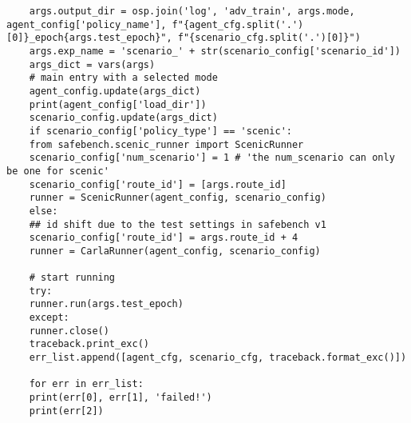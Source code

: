 \begin{enumerate}
\begin{verbatim}
	args.output_dir = osp.join('log', 'adv_train', args.mode, agent_config['policy_name'], f"{agent_cfg.split('.')[0]}_epoch{args.test_epoch}", f"{scenario_cfg.split('.')[0]}")
	args.exp_name = 'scenario_' + str(scenario_config['scenario_id'])
	args_dict = vars(args)
	# main entry with a selected mode
	agent_config.update(args_dict)
	print(agent_config['load_dir'])
	scenario_config.update(args_dict)
	if scenario_config['policy_type'] == 'scenic':
	from safebench.scenic_runner import ScenicRunner
	scenario_config['num_scenario'] = 1 # 'the num_scenario can only be one for scenic'
	scenario_config['route_id'] = [args.route_id]
	runner = ScenicRunner(agent_config, scenario_config)
	else:
	## id shift due to the test settings in safebench v1
	scenario_config['route_id'] = args.route_id + 4
	runner = CarlaRunner(agent_config, scenario_config)
	
	# start running
	try:
	runner.run(args.test_epoch)
	except:
	runner.close()
	traceback.print_exc()
	err_list.append([agent_cfg, scenario_cfg, traceback.format_exc()])
	
	for err in err_list:
	print(err[0], err[1], 'failed!')
	print(err[2])
	
\end{verbatim}
\end{enumerate}